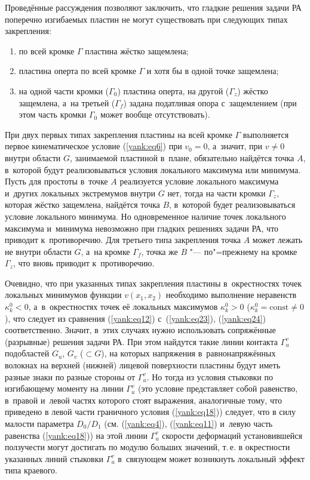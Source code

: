 Проведённые рассуждения позволяют заключить, что гладкие решения задачи РА поперечно изгибаемых пластин не могут существовать при следующих типах закрепления:
\begin{enumerate}
\item по всей кромке $\Gamma$ пластина жёстко защемлена;
\item пластина оперта по всей кромке $\Gamma$ и хотя бы в одной точке защемлена;
\item на одной части кромки ($\Gamma_0 $) пластина оперта, на другой ($\Gamma_z $) жёстко защемлена, а~на третьей ($\Gamma_{f}$) задана податливая опора с~защемлением (при этом часть кромки $\Gamma_0 $ может вообще отсутствовать).
\end{enumerate}

При двух первых типах закрепления пластины на всей кромке $\Gamma$ выполняется первое кинематическое условие (\ref{yank:eq6}) при $v_0 =0$, а~значит, при $v\neq0$ внутри области $G$, занимаемой пластиной в~плане, обязательно найдётся точка $A$, в~которой будут реализовываться условия локального максимума или минимума. 
Пусть для простоты в~точке $A$ реализуется условие локального максимума и~других локальных экстремумов внутри $G$ нет, тогда на части кромки $\Gamma_z $, которая жёстко защемлена, найдётся точка $B$, в~которой будет реализовываться условие локального минимума. 
Но одновременное наличие точек локального максимума и~минимума невозможно при гладких решениях задачи РА, что приводит к~противоречию. 
Для третьего типа закрепления точка $A$ может лежать не внутри области $G$, а~на кромке $\Gamma_{f}$, точка же $B$ "--- по"=прежнему на кромке $\Gamma_z $, что вновь приводит к~противоречию.

Очевидно, что при указанных типах закрепления пластины в~окрестностях точек локальных минимумов функции $v(x_1 , x_2 )$ необходимо выполнение неравенств $\kappa_k ^0 <0$, а~в~окрестностях точек её локальных максимумов $\kappa_k ^0 >0$ ($\kappa_k^0 =\text{const}\neq0$), что следует из сравнения (\ref{yank:eq12}) с~(\ref{yank:eq23}), (\ref{yank:eq24}) соответственно. 
Значит, в~этих случаях нужно использовать сопряжённые (разрывные) решения задачи РА. 
При этом найдутся такие линии контакта $\Gamma_{u}^{v}$ подобластей $G_{u}$, $G_{v}$ ($\subset G$), на которых напряжения
в~равнонапряжённых волокнах на верхней (нижней) лицевой поверхности пластины будут иметь разные знаки по разные стороны от $\Gamma_{u}^{v}$.
Но тогда из условия стыковки по изгибающему моменту на линии $\Gamma_{u}^{v}$ (это условие представляет собой равенство, в~правой и~левой частях которого стоят выражения, аналогичные тому, что приведено в левой части граничного условия (\ref{yank:eq18})) следует, что в силу малости параметра $D_0 /D_1 $ (см. (\ref{yank:eq4}), (\ref{yank:eq11}) и~левую часть равенства (\ref{yank:eq18})) на этой линии $\Gamma_{u}^{v}$ скорости деформаций установившейся ползучести могут достигать по модулю больших значений, т.\,е. в окрестности указанных линий стыковки $\Gamma_{u}^{v}$ в~связующем может возникнуть локальный эффект типа краевого.

